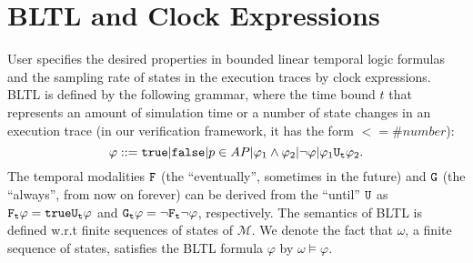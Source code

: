 \documentclass{llncs}
\begin{document}
\section{BLTL and Clock Expressions}
User specifies the desired properties in bounded linear temporal logic formulas and the sampling rate of states in the execution traces by clock expressions. BLTL is defined by the following grammar, where the time bound $t$ that represents an amount of simulation time or a number of state changes in an execution trace (in our verification framework, it has the form $<= \#number$):
\begin{displaymath}
\varphi ::= \begin{tt}true\end{tt} | \begin{tt}false\end{tt} | p \in AP | \varphi_1 \wedge \varphi_2 | \neg \varphi | \varphi_1 \begin{tt}U_{t}\end{tt} \varphi_2.
\end{displaymath}
 The temporal modalities $\begin{tt}F\end{tt}$ (the ``eventually'', sometimes in the future) and $\begin{tt}G\end{tt}$ (the ``always'', from now on forever) can be derived from the ``until'' $\begin{tt}U\end{tt}$ as $\begin{tt}F_{t}\end{tt}\varphi = \begin{tt}true\end{tt}\begin{tt}U_{t}\end{tt} \varphi$ and $\begin{tt}G_{t}\end{tt}\varphi = \neg \begin{tt}F_{t}\end{tt}\neg \varphi$, respectively. The semantics of BLTL is defined w.r.t finite sequences of states of $\mathcal{M}$. We denote the fact that $\omega$, a finite sequence of states, satisfies the BLTL formula $\varphi$ by $\omega \models \varphi$.
\end{document}
